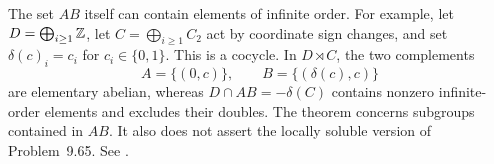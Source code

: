 The set \(AB\) itself can contain elements of infinite order.
For example, let \(D=\bigoplus_{i\ge1}\mathbb Z\), let
\(C=\bigoplus_{i\ge1}C_2\) act by coordinate sign changes, and set
\(\delta(c)_i=c_i\) for \(c_i\in\{0,1\}\).
This is a cocycle. In \(D\rtimes C\), the two complements
\[
 A=\{(0,c)\},\qquad B=\{(\delta(c),c)\}
\]
are elementary abelian, whereas \(D\cap AB=-\delta(C)\) contains
nonzero infinite-order elements and excludes their doubles.
The theorem concerns subgroups contained in \(AB\).
It also does not assert the locally soluble version of Problem~9.65.
See .
